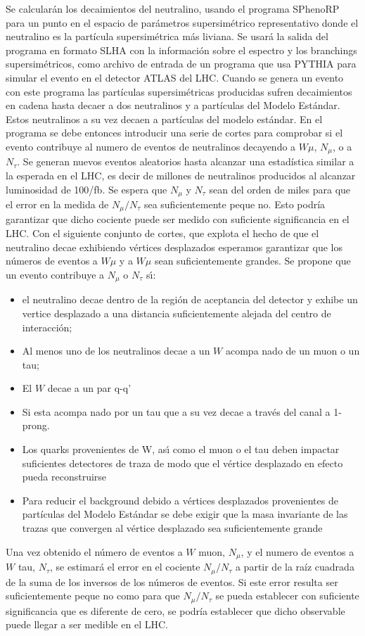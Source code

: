 Se calcularán los decaimientos del neutralino, usando el programa
SPhenoRP para un punto en el espacio de parámetros supersimétrico
representativo %
donde el neutralino es
la partícula supersimétrica más liviana. Se usará la salida del
programa en formato SLHA %
con la información
sobre el espectro y los branchings supersimétricos, como archivo de
entrada de un programa que usa PYTHIA %
para
simular el evento en el detector ATLAS del LHC. Cuando se genera un
evento con este programa las partículas supersimétricas
producidas sufren decaimientos en cadena hasta decaer a dos
neutralinos y a partículas del Modelo Estándar. Estos neutralinos
a su vez decaen a partículas del modelo estándar.  En el programa
se debe entonces introducir una serie de cortes para comprobar si el
evento contribuye al numero de eventos de neutralinos decayendo a
$W\mu$, $N_\mu$, o a $N_\tau$. Se generan nuevos eventos aleatorios hasta
alcanzar una estadística similar a la esperada en el LHC, es
decir de millones de neutralinos producidos al alcanzar luminosidad de
100/fb.  Se espera que $N_\mu$ y $N_\tau$ sean del orden de miles para que
el error en la medida de $N_\mu/N_\tau$ sea suficientemente peque no. Esto
podría garantizar que dicho cociente puede ser medido con
suficiente significancia en el LHC. Con el siguiente conjunto de
cortes, que explota el hecho de que el neutralino decae exhibiendo
vértices desplazados %
 esperamos garantizar que
los números de eventos a $W\mu$ y a $W\mu$ sean suficientemente grandes.
Se propone que un evento contribuye a $N_\mu$ o $N_\tau$ s\'\i:
\begin{itemize}
\item el neutralino decae dentro de la región de aceptancia del
  detector y exhibe un vertice desplazado a una distancia
  suficientemente alejada del centro de interacción;
\item Al menos uno de los neutralinos decae a un $W$ acompa nado de un
  muon o un tau;
\item El $W$ decae a un par q-q'
\item Si esta acompa nado por un tau que a su vez decae a través del
  canal a 1-prong.
\item Los quarks provenientes de W, as\'\i{} como el muon o el tau deben
  impactar suficientes detectores de traza de modo que el vértice
  desplazado en efecto pueda reconstruirse
\item Para reducir el background debido a vértices desplazados
  provenientes de partículas del Modelo Estándar se debe exigir que la
  masa invariante de las trazas que convergen al vértice desplazado
  sea suficientemente grande
\end{itemize}
Una vez obtenido el número de eventos a $W$ muon, $N_\mu$, y el numero
de eventos a $W$ tau, $N_\tau$, se estimará el error en el cociente
$N_\mu/N_\tau$ a partir de la raíz cuadrada de la suma de los inversos de
los números de eventos. Si este error resulta ser suficientemente
peque no como para que $N_\mu/N_\tau$ se pueda establecer con suficiente
significancia que es diferente de cero, se podría establecer que dicho
observable puede llegar a ser medible en el LHC.

